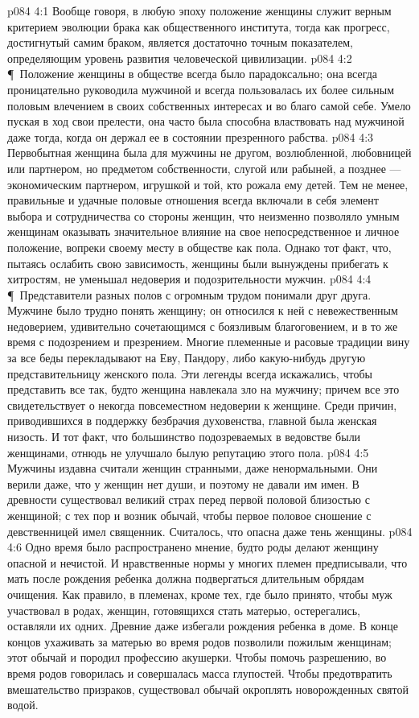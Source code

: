 \vs p084 4:1 Вообще говоря, в любую эпоху положение женщины служит верным критерием эволюции брака как общественного института, тогда как прогресс, достигнутый самим браком, является достаточно точным показателем, определяющим уровень развития человеческой цивилизации.
\vs p084 4:2 \P\ Положение женщины в обществе всегда было парадоксально; она всегда проницательно руководила мужчиной и всегда пользовалась их более сильным половым влечением в своих собственных интересах и во благо самой себе. Умело пуская в ход свои прелести, она часто была способна властвовать над мужчиной даже тогда, когда он держал ее в состоянии презренного рабства.
\vs p084 4:3 Первобытная женщина была для мужчины не другом, возлюбленной, любовницей или партнером, но предметом собственности, слугой или рабыней, а позднее --- экономическим партнером, игрушкой и той, кто рожала ему детей. Тем не менее, правильные и удачные половые отношения всегда включали в себя элемент выбора и сотрудничества со стороны женщин, что неизменно позволяло умным женщинам оказывать значительное влияние на свое непосредственное и личное положение, вопреки своему месту в обществе как пола. Однако тот факт, что, пытаясь ослабить свою зависимость, женщины были вынуждены прибегать к хитростям, не уменьшал недоверия и подозрительности мужчин.
\vs p084 4:4 \P\ Представители разных полов с огромным трудом понимали друг друга. Мужчине было трудно понять женщину; он относился к ней с невежественным недоверием, удивительно сочетающимся с боязливым благоговением, и в то же время с подозрением и презрением. Многие племенные и расовые традиции вину за все беды перекладывают на Еву, Пандору, либо какую\hyp{}нибудь другую представительницу женского пола. Эти легенды всегда искажались, чтобы представить все так, будто женщина навлекала зло на мужчину; причем все это свидетельствует о некогда повсеместном недоверии к женщине. Среди причин, приводившихся в поддержку безбрачия духовенства, главной была женская низость. И тот факт, что большинство подозреваемых в ведовстве были женщинами, отнюдь не улучшало былую репутацию этого пола.
\vs p084 4:5 Мужчины издавна считали женщин странными, даже ненормальными. Они верили даже, что у женщин нет души, и поэтому не давали им имен. В древности существовал великий страх перед первой половой близостью с женщиной; с тех пор и возник обычай, чтобы первое половое сношение с девственницей имел священник. Считалось, что опасна даже тень женщины.
\vs p084 4:6 Одно время было распространено мнение, будто роды делают женщину опасной и нечистой. И нравственные нормы у многих племен предписывали, что мать после рождения ребенка должна подвергаться длительным обрядам очищения. Как правило, в племенах, кроме тех, где было принято, чтобы муж участвовал в родах, женщин, готовящихся стать матерью, остерегались, оставляли их одних. Древние даже избегали рождения ребенка в доме. В конце концов ухаживать за матерью во время родов позволили пожилым женщинам; этот обычай и породил профессию акушерки. Чтобы помочь разрешению, во время родов говорилась и совершалась масса глупостей. Чтобы предотвратить вмешательство призраков, существовал обычай окроплять новорожденных святой водой.
